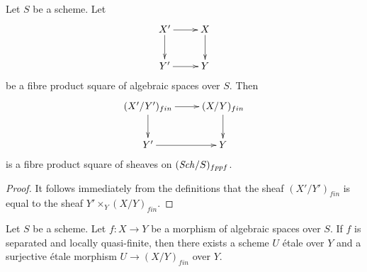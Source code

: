 \begin{lemma}
\label{lemma-finite-pullback}
Let $S$ be a scheme.
Let
$$
\xymatrix{
X' \ar[d] \ar[r] & X \ar[d] \\
Y' \ar[r] & Y
}
$$
be a fibre product square of algebraic spaces over $S$. Then
$$
\xymatrix{
(X'/Y')_{fin} \ar[d] \ar[r] & (X/Y)_{fin} \ar[d] \\
Y' \ar[r] & Y
}
$$
is a fibre product square of sheaves on $(\mathit{Sch}/S)_{fppf}$.
\end{lemma}

\begin{proof}
It follows immediately from the definitions that
the sheaf $(X'/Y')_{fin}$ is equal to the sheaf
$Y' \times_Y (X/Y)_{fin}$.
\end{proof}

\begin{lemma}
\label{lemma-finite-surjective-etale-cover}
Let $S$ be a scheme.
Let $f : X \to Y$ be a morphism of algebraic spaces over $S$.
If $f$ is separated and locally quasi-finite, then there exists a
scheme $U$ \'etale over $Y$ and a surjective \'etale morphism
$U \to (X/Y)_{fin}$ over $Y$.
\end{lemma}

